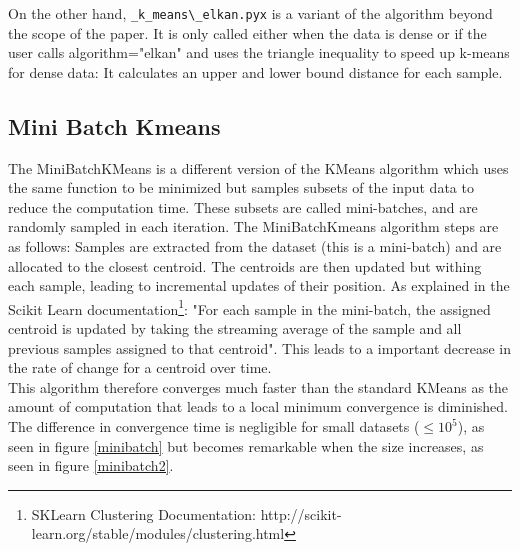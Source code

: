 \documentclass[11pt]{article}
\begin{document}
\noindent On the other hand, \verb|_k_means\_elkan.pyx| is a variant of the algorithm beyond the scope of the paper. It is only called either when the data is dense or if the user calls algorithm="elkan" and uses the triangle inequality to speed up k-means for dense data: It calculates an upper and lower bound distance for each sample. 

\subsection*{Mini Batch Kmeans}
The MiniBatchKMeans is a different version of the KMeans algorithm which uses the same function to be minimized but samples subsets of the input data to reduce the computation time. These subsets are called mini-batches, and are randomly sampled in each iteration. The MiniBatchKmeans algorithm steps are as follows: Samples are extracted from the dataset (this is a mini-batch) and are allocated to the closest centroid. The centroids are then updated but withing each sample, leading to incremental updates of their position. As explained in the Scikit Learn documentation\footnote{SKLearn Clustering Documentation: http://scikit-learn.org/stable/modules/clustering.html}:
"For each sample in the mini-batch, the assigned centroid is updated by taking the streaming average of the sample and all previous samples assigned to that centroid". 
This leads to a important decrease in the rate of change for a centroid over time.\\

\noindent This algorithm therefore converges much faster than the standard KMeans as the amount of computation that leads to a local minimum convergence is diminished. The difference in convergence time is negligible for small datasets ($\leq 10^5$), as seen in figure \ref{minibatch} but becomes remarkable when the size increases, as seen in figure \ref{minibatch2}.\\
\end{document}
